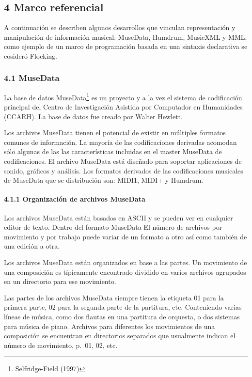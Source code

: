 \documentclass[]{article}
\let\oldparagraph\paragraph
\renewcommand{\paragraph}[1]{\oldparagraph{#1}\mbox{}}
\begin{document}
\hypertarget{marco-referencial}{%
\subsection{4 Marco referencial}\label{marco-referencial}}

A continuación se describen algunos desarrollos que vinculan
representación y manipulación de información musical: MuseData, Humdrum,
MusicXML y MML; como ejemplo de un marco de programación basada en una
sintaxis declarativa se cosideró Flocking.

\hypertarget{musedata}{%
\subsubsection{4.1 MuseData}\label{musedata}}

La base de datos MuseData\footnote{Selfridge-Field (1997)} es un
proyecto y a la vez el sistema de codificación principal del Centro de
Investigación Asistida por Computador en Humanidades (CCARH). La base de
datos fue creado por Walter Hewlett.

Los archivos MuseData tienen el potencial de existir en múltiples
formatos comunes de información. La mayoría de las codificaciones
derivadas acomodan sólo algunas de las las características incluidas en
el master MuseData de codificaciones. El archivo MuseData está diseñado
para soportar aplicaciones de sonido, gráficos y análisis. Los formatos
derivados de las codificaciones musicales de MuseData que se
distribución son: MIDI1, MIDI+ y Humdrum.

\hypertarget{organizaciuxf3n-de-archivos-musedata}{%
\paragraph{4.1.1 Organización de archivos
MuseData}\label{organizaciuxf3n-de-archivos-musedata}}

Los archivos MuseData están basados en ASCII y se pueden ver en
cualquier editor de texto. Dentro del formato MuseData El número de
archivos por movimiento y por trabajo puede variar de un formato a otro
así como también de una edición a otra.

Los archivos MuseData están organizados en base a las partes. Un
movimiento de una composición es típicamente encontrado dividido en
varios archivos agrupados en un directorio para ese movimiento.

Las partes de los archivos MuseData siempre tienen la etiqueta 01 para
la primera parte, 02 para la segunda parte de la partitura, etc.
Conteniendo varias líneas de música, como dos flautas en una partitura
de orquesta, o dos sistemas para música de piano. Archivos para
diferentes los movimientos de una composición se encuentran en
directorios separados que usualmente indican el número de movimiento,
p.~01, 02, etc.
\end{document}
